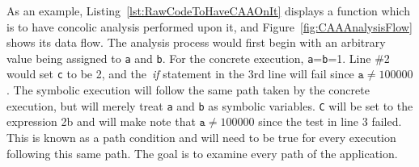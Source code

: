 \documentclass{sig-alternate}
\newcommand{\todo}[1]{\textcolor{cyan}{\textbf{[#1]}}}
\begin{document}



As an example, Listing~\ref{lst:RawCodeToHaveCAAOnIt} displays a function which is to have concolic analysis performed upon it, and Figure~\ref{fig:CAAAnalysisFlow} shows its data flow. The analysis process would first begin with an arbitrary value being assigned to \texttt{a} and \texttt{b}. For the concrete execution, \texttt{a}=\texttt{b}=1. Line \#2 would set \texttt{c} to be 2, and the~\emph{if} statement in the 3rd line will fail since $ \texttt{a} \neq 100000$. The symbolic execution will follow the same path taken by the concrete execution, but will merely treat \texttt{a} and \texttt{b} as symbolic variables. \texttt{C} will be set to the expression 2b and will make note that $ \texttt{a} \neq 100000$ since the test in line 3 failed. This is known as a path condition and will need to be true for every execution following this same path. The goal is to examine every path of the application.




\end{document}
